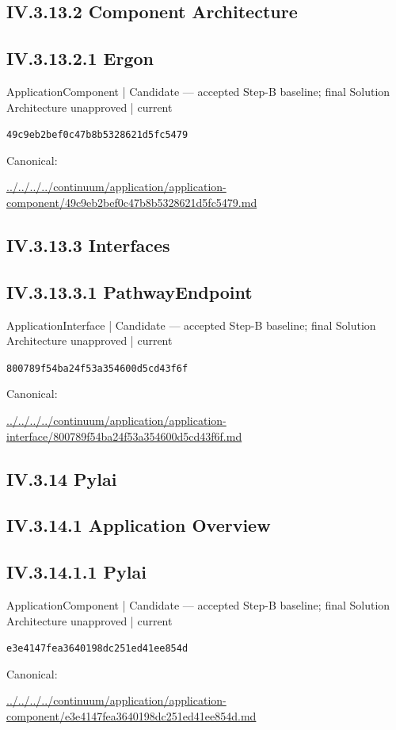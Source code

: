 \documentclass[10pt,a4paper]{article}
\begin{document}
\subsection*{IV.3.13.2 Component Architecture}
\subsection*{IV.3.13.2.1 Ergon}
{\small ApplicationComponent | Candidate — accepted Step-B baseline; final Solution Architecture unapproved | current}\par
\texttt{49c9eb2bef0c47b8b5328621d5fc5479}\par
Canonical: \par
{\footnotesize\url{../../../../continuum/application/application-component/49c9eb2bef0c47b8b5328621d5fc5479.md}}\par
\subsection*{IV.3.13.3 Interfaces}
\subsection*{IV.3.13.3.1 PathwayEndpoint}
{\small ApplicationInterface | Candidate — accepted Step-B baseline; final Solution Architecture unapproved | current}\par
\texttt{800789f54ba24f53a354600d5cd43f6f}\par
Canonical: \par
{\footnotesize\url{../../../../continuum/application/application-interface/800789f54ba24f53a354600d5cd43f6f.md}}\par
\subsection*{IV.3.14 Pylai}
\subsection*{IV.3.14.1 Application Overview}
\subsection*{IV.3.14.1.1 Pylai}
{\small ApplicationComponent | Candidate — accepted Step-B baseline; final Solution Architecture unapproved | current}\par
\texttt{e3e4147fea3640198dc251ed41ee854d}\par
Canonical: \par
{\footnotesize\url{../../../../continuum/application/application-component/e3e4147fea3640198dc251ed41ee854d.md}}\par
\end{document}
